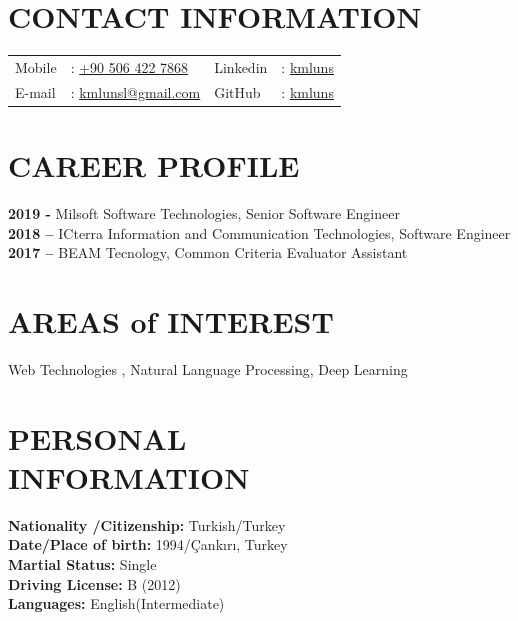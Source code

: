 \documentclass[margin]{res}
\begin{document}
\begin{resume}

\section{\mysidestyle \textbf{CONTACT INFORMATION}}
\begin{tabular}{@{} l l l l}
Mobile & :  \href{tel:905064227868}{+90 506 422 7868}  &  Linkedin & :  \href{https://www.linkedin.com/in/kmluns?locale=en_US}{kmluns} \\
E-mail & :  \href{mailto:kmlunsl@gmail.com}{kmlunsl@gmail.com} & GitHub & :  \href{https://github.com/kmluns}{kmluns} \\
\end{tabular}


\section{\mysidestyle \textbf{CAREER PROFILE}}
\textbf{2019 - } Milsoft Software Technologies, Senior Software Engineer \\
\newline
\textbf{2018 –} ICterra Information and Communication Technologies, Software Engineer \\	
\newline
\textbf{2017 –} BEAM Tecnology, Common Criteria Evaluator Assistant \\	
\newline

\section{\mysidestyle \textbf{AREAS of INTEREST}} Web Technologies , Natural Language Processing, Deep Learning \\[0.08in]


\section{\mysidestyle \textbf{PERSONAL\\INFORMATION}}
\textbf{Nationality /Citizenship:} Turkish/Turkey\\
\textbf{Date/Place of birth:} 1994/Çankırı, Turkey\\
\textbf{Martial Status:} Single\\
\textbf{Driving License:} B (2012)\\
\textbf{Languages:} English(Intermediate)\\


\end{resume}
\end{document}
